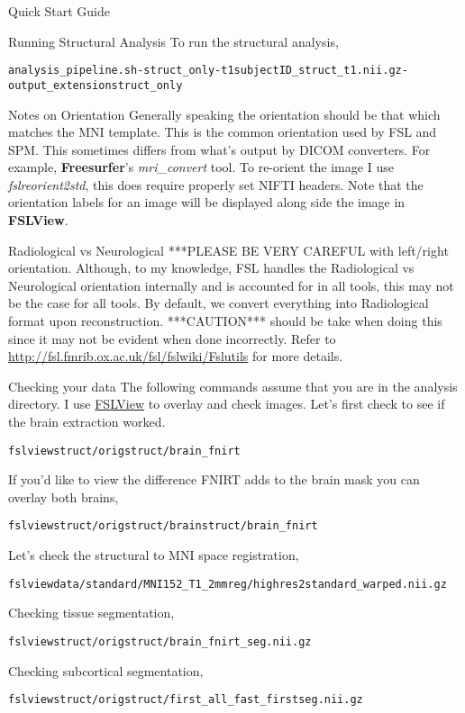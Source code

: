 \documentclass[]{report}
\begin{document}
\begin{chapter}{Quick Start Guide }
\begin{section}{Running Structural Analysis}
To run the structural analysis, 
\begin{alltt}
analysis_pipeline.sh -struct_only -t1 subjectID\_struct\_t1.nii.gz  -output\_extension struct\_only
\end{alltt}


\begin{subsection}{Notes on Orientation}
Generally speaking the orientation should be that which matches the MNI template. This is the common orientation used by FSL and SPM.  This sometimes differs from what's output by DICOM converters. For example, {\bf Freesurfer}'s {\it mri\_convert} tool. To re-orient the image I use  {\it fslreorient2std}, this does require properly set NIFTI headers. Note that the orientation labels for an image will be displayed along side the image in {\bf FSLView}.
\begin{subsubsection}{Radiological vs Neurological}
***PLEASE BE VERY CAREFUL with left/right orientation. Although, to my knowledge, FSL handles the Radiological vs Neurological orientation internally and is accounted for in all tools, this may not be the case for all tools.  By default, we convert everything into Radiological format upon reconstruction. ***CAUTION***  should be take when doing this since it may not be evident when done incorrectly. Refer to \url{http://fsl.fmrib.ox.ac.uk/fsl/fslwiki/Fslutils} for more details. 

\end{subsubsection}
\end{subsection}

\begin{subsection}{Checking your data}
The following commands assume that you are in the analysis directory. I use \href{fsl.fmrib.ox.ac.uk/fsl/fslview}{FSLView} to overlay 
and check images. 
Let's first check to see if the brain extraction worked. 
\begin{alltt}
\indent fslview struct/orig struct/brain\_fnirt
\end{alltt}
If you'd like to view the difference FNIRT adds to the brain mask you can overlay both brains,
 \begin{alltt}
\indent  fslview struct/orig  struct/brain struct/brain\_fnirt
\end{alltt}
Let's check the structural to MNI space registration,
 \begin{alltt}
\indent  fslview data/standard/MNI152_T1_2mm  reg/highres2standard_warped.nii.gz
\end{alltt}
Checking tissue segmentation,
 \begin{alltt}
\indent  fslview struct/orig  struct/brain\_fnirt\_seg.nii.gz
\end{alltt}
Checking subcortical segmentation,
 \begin{alltt}
\indent  fslview struct/orig  struct/first\_all\_fast\_firstseg.nii.gz 
\end{alltt}


\end{subsection}
\end{section}
\end{chapter}
\end{document}
